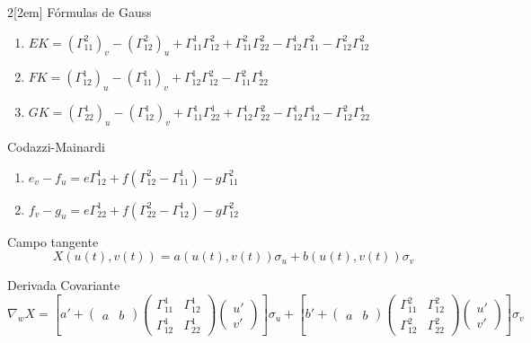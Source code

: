 \documentclass{myclass}
\begin{document}
\begin{multicols}{2}[\columnsep2em]
Fórmulas de Gauss
\begin{enumerate}[topsep=-6pt, itemsep=0pt]
    \item $EK = (\Gamma_{11}^2)_v - (\Gamma_{12}^2)_u + \Gamma_{11}^1\Gamma_{12}^2 + \Gamma_{11}^2\Gamma_{22}^2 - \Gamma_{12}^1\Gamma_{11}^2 - \Gamma_{12}^2\Gamma_{12}^2$
    \item $FK = (\Gamma_{12}^1)_u - (\Gamma_{11}^1)_v + \Gamma_{12}^1\Gamma_{12}^2 - \Gamma_{11}^2\Gamma_{22}^1$
    \item $GK = (\Gamma_{22}^1)_u - (\Gamma_{12}^1)_v + \Gamma_{11}^1\Gamma_{22}^1 + \Gamma_{12}^1\Gamma_{22}^2 - \Gamma_{12}^1\Gamma_{12}^1 - \Gamma_{12}^2\Gamma_{22}^1$
  \end{enumerate}

  Codazzi-Mainardi
  \begin{enumerate}[topsep=-6pt, itemsep=0pt]
    \item $e_v-f_u = e\Gamma_{12}^1 + f(\Gamma_{12}^2 - \Gamma _{11}^1) - g\Gamma_{11}^2$
	\item $f_v-g_u = e\Gamma_{22}^1 + f(\Gamma_{22}^2-\Gamma_{12}^1)-g\Gamma_{12}^2$
  \end{enumerate}


\end{multicols}
\newpage

Campo tangente
\[
X(u(t), v(t)) = a(u(t), v(t))\sigma _u + b(u(t), v(t))\sigma _v
\]

Derivada Covariante
\[
  \nabla _wX = \left[ a' + \begin{pmatrix} a & b \end{pmatrix} \begin{pmatrix} \Gamma_{11}^1 & \Gamma _{12}^1 \\ \Gamma _{12}^1 & \Gamma_{22}^1 \end{pmatrix} \begin{pmatrix} u' \\ v' \end{pmatrix}   \right] \sigma _u + \left[ b' + \begin{pmatrix} a & b \end{pmatrix} \begin{pmatrix} \Gamma _{11}^2 & \Gamma _{12}^2 \\ \Gamma _{12}^2 & \Gamma _{22}^2 \end{pmatrix} \begin{pmatrix} u' \\ v' \end{pmatrix}   \right] \sigma _v
\]
\end{document}

